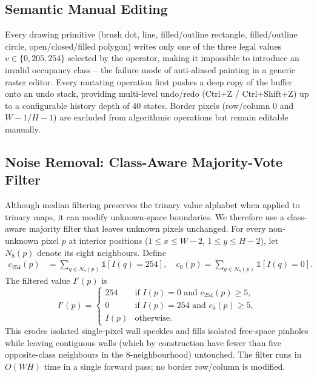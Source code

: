 \documentclass[journal]{IEEEtran}
\begin{document}
\subsection{Semantic Manual Editing}

Every drawing primitive (brush dot, line, filled/outline rectangle,
filled/outline circle, open/closed/filled polygon) writes only one of the
three legal values $v\in\{0,205,254\}$ selected by the operator, making it
impossible to introduce an invalid occupancy class -- the failure mode of
anti-aliased painting in a generic raster editor.  Every mutating operation
first pushes a deep copy of the buffer onto an undo stack, providing
multi-level undo/redo (Ctrl+Z / Ctrl+Shift+Z) up to a configurable history
depth of 40 states.  Border pixels (row/column 0 and $W\!-\!1$/$H\!-\!1$)
are excluded from algorithmic operations but remain editable manually.

\subsection{Noise Removal: Class-Aware Majority-Vote Filter}
\label{subsec:filter}

Although median filtering preserves the trinary value alphabet when applied
to trinary maps, it can modify unknown-space boundaries.  We therefore use a
class-aware majority filter that leaves unknown pixels unchanged.  For every
non-unknown pixel $p$ at interior positions ($1\leq x\leq W\!-\!2$,
$1\leq y\leq H\!-\!2$), let $N_8(p)$ denote its eight neighbours.
Define
\begin{align}
c_{254}(p) &= \sum_{q\in N_8(p)} \mathbb{1}[I(q)=254],\quad
c_{0}(p)   = \sum_{q\in N_8(p)} \mathbb{1}[I(q)=0].
\end{align}
The filtered value $I'(p)$ is
\begin{equation}
I'(p) = \begin{cases}
254 & \text{if } I(p)=0 \text{ and } c_{254}(p)\geq 5,\\
0   & \text{if } I(p)=254 \text{ and } c_{0}(p)\geq 5,\\
I(p) & \text{otherwise}.
\end{cases}
\end{equation}
This erodes isolated single-pixel wall speckles and fills isolated free-space
pinholes while leaving contiguous walls (which by construction have fewer than
five opposite-class neighbours in the 8-neighbourhood) untouched.  The filter
runs in $O(WH)$ time in a single forward pass; no border row/column is
modified.
\end{document}
